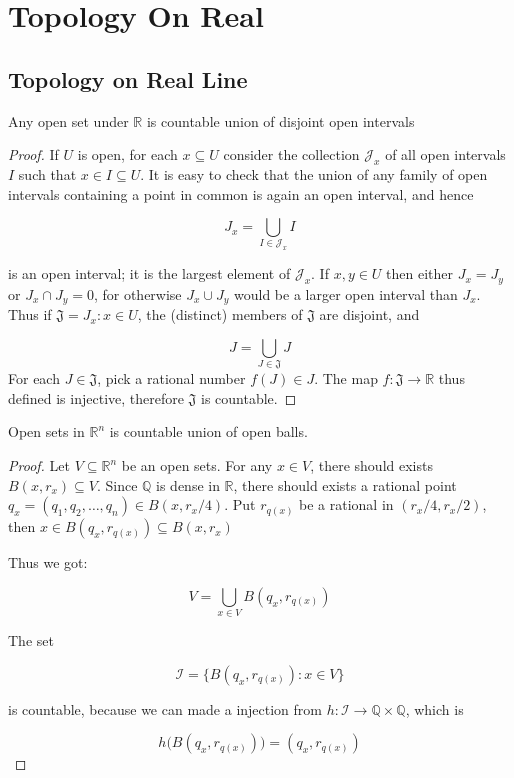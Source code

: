 \section{Topology On Real}

\subsection{Topology on Real Line}

\begin{thm}
    Any open set under $\mathbb{R}$ is countable union
    of disjoint open intervals
\end{thm}

\begin{proof}
    If $U$ is open, for each $x \subseteq U$ consider the collection $\mathcal{J}_x$ of all open
intervals $I$ such that $x \in I \subseteq U$. It is easy to check that the union of any family
of open intervals containing a point in common is again an open interval, and hence

\[
    J_x = \bigcup_{I \in \mathcal{J}_x} I
\]

is an open interval; it is the largest element of $\mathcal{J}_x$. If $x, y \in U$ then
either $J_x = J_y$ or $J_x \cap J_y = 0$, for otherwise $J_x \cup J_y$ 
would be a larger open interval
than $J_x$. Thus if $\mathfrak{J} = { J_x : x \in U}$, the (distinct) members of $\mathfrak{J}$ are disjoint,
and 

\[
J = \bigcup_{J \in \mathfrak{J}} J
\]
For each $J \in \mathfrak{J}$, pick a rational number $f(J) \in J$. The map
$f : \mathfrak{J} \to \mathbb{R}$ thus defined is injective,  therefore $\mathfrak{J}$ is
countable.
\end{proof}

\begin{thm}
    Open sets in $\mathbb{R}^n$ is countable union of open balls.
\end{thm}

\begin{proof}
   Let $V \subseteq \mathbb{R}^n$ be an open sets. For any $x \in V$, there should exists $B(x, r_x) \subseteq V$. 
   Since $\mathbb{Q}$ is dense in $\mathbb{R}$, there should exists a rational point $q_x = (q_1,q_2,\dots,q_n) \in B(x, r_x/4)$.
   Put $r_{q(x)}$ be a rational in $(r_x /4 ,r_x/2)$, then $x \in B(q_x, r_{q(x)}) \subseteq B(x, r_x)$

   Thus we got:

   \[
    V = \bigcup_{x \in V} B(q_x ,r_{q(x)})
   \]

   The set

   \[
    \mathcal{I} = \{ B(q_x, r_{q(x)}): x \in V\}
   \]

   is countable, because we can made a injection from $h: \mathcal{I} \to \mathbb{Q} \times \mathbb{Q}$, which is 

   \[
    h\Big(B(q_x, r_{q(x)})\Big) = (q_x, r_{q(x)})
   \]
\end{proof}
